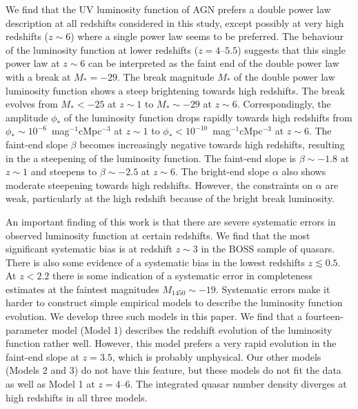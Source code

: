 \documentclass[fleqn,usenatbib]{mnras}
\begin{document}
      We find that the UV luminosity function of AGN prefers a double power
      law description at all redshifts considered in this study, except
      possibly at very high redshifts ($z\sim 6$) where a single power law
      seems to be preferred.  The behaviour of the luminosity function at
      lower redshifts ($z=4$--$5.5$) suggests that this single power law at
      $z\sim 6$ can be interpreted as the faint end of the double power law
      with a break at $M_*=-29$.  The break magnitude $M_*$ of the double
      power law luminosity function shows a steep brightening towards high
      redshifts.  The break evolves from $M_*<-25$ at $z\sim 1$ to $M_*\sim
      -29$ at $z\sim 6$.  Correspondingly, the amplitude $\phi_*$ of the
      luminosity function drops rapidly towards high redshifts from
      $\phi_*\sim 10^{-6}$~mag$^{-1}$cMpc$^{-3}$ at $z\sim 1$ to $\phi_*<
      10^{-10}$~mag$^{-1}$cMpc$^{-3}$ at $z\sim 6$.  The faint-end slope
      $\beta$ becomes increasingly negative towards high redshifts,
      resulting in the a steepening of the luminosity function.  The
      faint-end slope is $\beta\sim -1.8$ at $z\sim 1$ and steepens to
      $\beta\sim-2.5$ at $z\sim 6$.  The bright-end slope $\alpha$ also
      shows moderate steepening towards high redshifts.  However, the
      constraints on $\alpha$ are weak, particularly at the high redshift
      because of the bright break luminosity.

      An important finding of this work is that there are severe systematic
      errors in observed luminosity function at certain redshifts.  We find
      that the most significant systematic bias is at redshift $z\sim 3$ in
      the BOSS sample of quasars.  There is also some evidence of a
      systematic bias in the lowest redshifts $z\lesssim 0.5$.  At $z<2.2$
      there is some indication of a systematic error in completeness
      estimates at the faintest magnitudes $M_{1450}\sim -19$.  Systematic
      errors make it harder to construct simple empirical models to describe
      the luminosity function evolution.  We develop three such models in
      this paper.  We find that a fourteen-parameter model (Model 1)
      describes the redshift evolution of the luminosity function rather
      well.  However, this model prefers a very rapid evolution in the
      faint-end slope at $z=3.5$, which is probably unphysical.  Our other
      models (Models 2 and 3) do not have this feature, but these models do
      not fit the data as well as Model 1 at $z=4$--$6$.  The integrated
      quasar number density diverges at high redshifts in all three models.
\end{document}
